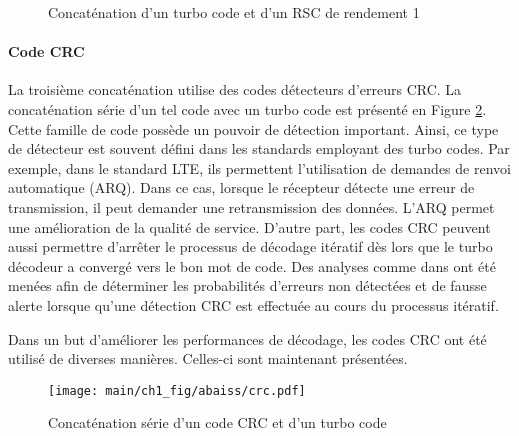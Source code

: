 \begin{figure}[tb]
  \begin{center}
    \caption{Concaténation d'un turbo code et d'un RSC de rendement 1}
    \label{fig:t3d}
  \end{center}
\end{figure}

\paragraph{Code CRC}
La troisième concaténation utilise des codes détecteurs d'erreurs CRC. La concaténation série d'un tel code avec un 
turbo code est présenté en Figure \ref{fig:crc}. Cette famille de code possède un pouvoir de détection important. Ainsi, 
ce type de détecteur est souvent défini dans les standards employant des turbo codes. Par exemple, dans le standard LTE, 
ils permettent l'utilisation de demandes de renvoi automatique (ARQ). Dans ce cas, lorsque le récepteur détecte une 
erreur de transmission, il peut demander une retransmission des données. L'ARQ permet une amélioration de la qualité de 
service. D'autre part, les codes CRC peuvent aussi permettre d'arrêter le processus de décodage itératif dès lors que le 
turbo décodeur a convergé vers le bon mot de code. Des analyses comme dans \cite{detectionCRC} ont été menées afin de 
déterminer les probabilités d'erreurs non détectées et de fausse alerte lorsque qu'une détection CRC est effectuée au 
cours du processus itératif. 

Dans un but d'améliorer les performances de décodage, les codes CRC ont été utilisé de diverses manières. Celles-ci sont 
maintenant présentées.

\begin{figure}[b]
	\begin{center}
	\texttt{[image: main/ch1\_fig/abaiss/crc.pdf]}
	\end{center}
	\caption{Concaténation série d'un code CRC et d'un turbo code \label{fig:crc}}
\end{figure}


